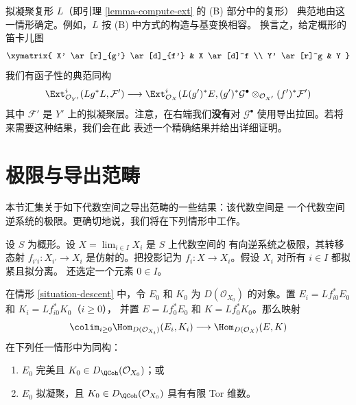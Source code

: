 \begin{remark}
\label{remark-base-change-of-L}
拟凝聚复形 $L$（即引理 \ref{lemma-compute-ext} 的 (B) 部分中的复形）
典范地由这一情形确定。例如，$L$ 按 (B) 中方式的构造与基变换相容。
换言之，给定概形的笛卡儿图 %
$$
\xymatrix{
X' \ar[r]_{g'} \ar[d]_{f'} &
X \ar[d]^f \\
Y' \ar[r]^g &
Y
}
$$
我们有函子性的典范同构
$$
\Ext^i_{\mathcal{O}_{Y'}}(Lg^*L, \mathcal{F}') \longrightarrow
\Ext^i_{\mathcal{O}_X}(L(g')^*E,
(g')^*\mathcal{G}^\bullet \otimes_{\mathcal{O}_{X'}} (f')^*\mathcal{F}')
$$
其中 $\mathcal{F}'$ 是 $Y'$ 上的拟凝聚层。注意，在右端我们\textbf{没有}对 %
$\mathcal{G}^\bullet$ 使用导出拉回。若将来需要这种结果，我们会在此
表述一个精确结果并给出详细证明。
\end{remark}

\section{极限与导出范畴}
\label{section-limits}

\noindent
本节汇集关于如下代数空间之导出范畴的一些结果：该代数空间是
一个代数空间逆系统的极限。更确切地说，我们将在下列情形中工作。

\begin{situation}
\label{situation-descent}
设 $S$ 为概形。设 $X = \lim_{i \in I} X_i$ 是 $S$ 上代数空间的
有向逆系统之极限，其转移态射
$f_{i'i} : X_{i'} \to X_i$ 是仿射的。把投影记为 %
$f_i : X \to X_i$。假设 $X_i$ 对所有 $i \in I$ 都拟紧且拟分离。
还选定一个元素 $0 \in I$。
\end{situation}

\begin{lemma}
\label{lemma-descend-homomorphisms}
在情形 \ref{situation-descent} 中，令 $E_0$ 和 $K_0$ 为
$D(\mathcal{O}_{X_0})$ 的对象。置
$E_i = Lf_{i0}^*E_0$ 和 $K_i = Lf_{i0}^*K_0$（$i \geq 0$），
并置 $E = Lf_0^*E_0$ 和 $K = Lf_0^*K_0$。那么映射
$$
\colim_{i \geq 0} \Hom_{D(\mathcal{O}_{X_i})}(E_i, K_i)
\longrightarrow
\Hom_{D(\mathcal{O}_X)}(E, K)
$$
在下列任一情形中为同构：
\begin{enumerate}
\item $E_0$ 完美且 $K_0 \in D_\QCoh(\mathcal{O}_{X_0})$；或
\item $E_0$ 拟凝聚，且
$K_0 \in D_\QCoh(\mathcal{O}_{X_0})$ 具有有限 Tor 维数。
\end{enumerate}
\end{lemma}

